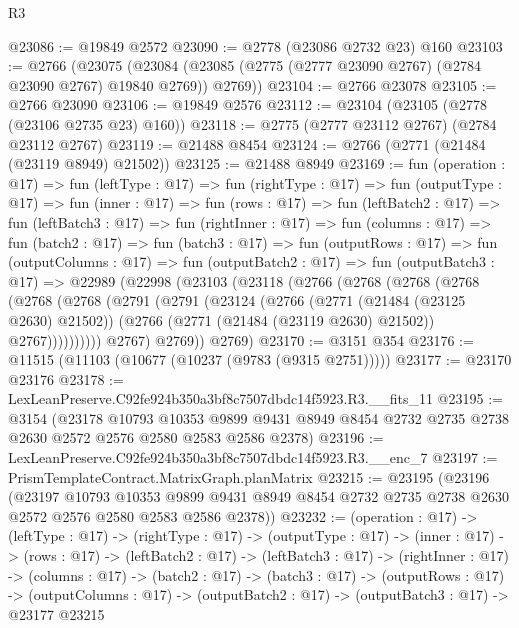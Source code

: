 \begin{lexlean}{R3}
\begin{coremodule}
@23086 := @19849 @2572
@23090 := @2778 (@23086 @2732 @23) @160
@23103 := @2766
    (@23075 (@23084 (@23085 (@2775 (@2777 @23090 @2767) (@2784 @23090 @2767) @19840 @2769)) @2769))
@23104 := @2766 @23078
@23105 := @2766 @23090
@23106 := @19849 @2576
@23112 := @23104 (@23105 (@2778 (@23106 @2735 @23) @160))
@23118 := @2775 (@2777 @23112 @2767) (@2784 @23112 @2767)
@23119 := @21488 @8454
@23124 := @2766 (@2771 (@21484 (@23119 @8949) @21502))
@23125 := @21488 @8949
@23169 := fun (operation : @17) =>
  fun (leftType : @17) =>
  fun (rightType : @17) =>
  fun (outputType : @17) =>
  fun (inner : @17) =>
  fun (rows : @17) =>
  fun (leftBatch2 : @17) =>
  fun (leftBatch3 : @17) =>
  fun (rightInner : @17) =>
  fun (columns : @17) =>
  fun (batch2 : @17) =>
  fun (batch3 : @17) =>
  fun (outputRows : @17) =>
  fun (outputColumns : @17) =>
  fun (outputBatch2 : @17) =>
  fun (outputBatch3 : @17) =>
  @22989
    (@22998
      (@23103
        (@23118
          (@2766
            (@2768
              (@2768
                (@2768
                  (@2768
                    (@2768
                      (@2791
                        (@2791
                          (@23124
                            (@2766
                              (@2771 (@21484 (@23125 @2630) @21502))
                              (@2766 (@2771 (@21484 (@23119 @2630) @21502)) @2767))))))))))
            @2767)
          @2769))
      @2769)
@23170 := @3151 @354
@23176 := @11515 (@11103 (@10677 (@10237 (@9783 (@9315 @2751)))))
@23177 := @23170 @23176
@23178 := LexLeanPreserve.C92fe924b350a3bf8c7507dbdc14f5923.R3.__fits_11
@23195 := @3154
    (@23178
      @10793
      @10353
      @9899
      @9431
      @8949
      @8454
      @2732
      @2735
      @2738
      @2630
      @2572
      @2576
      @2580
      @2583
      @2586
      @2378)
@23196 := LexLeanPreserve.C92fe924b350a3bf8c7507dbdc14f5923.R3.__enc_7
@23197 := PrismTemplateContract.MatrixGraph.planMatrix
@23215 := @23195
    (@23196
      (@23197
        @10793
        @10353
        @9899
        @9431
        @8949
        @8454
        @2732
        @2735
        @2738
        @2630
        @2572
        @2576
        @2580
        @2583
        @2586
        @2378))
@23232 := (operation : @17) ->
  (leftType : @17) ->
  (rightType : @17) ->
  (outputType : @17) ->
  (inner : @17) ->
  (rows : @17) ->
  (leftBatch2 : @17) ->
  (leftBatch3 : @17) ->
  (rightInner : @17) ->
  (columns : @17) ->
  (batch2 : @17) ->
  (batch3 : @17) ->
  (outputRows : @17) ->
  (outputColumns : @17) -> (outputBatch2 : @17) -> (outputBatch3 : @17) -> @23177 @23215

\end{coremodule}
\end{lexlean}
